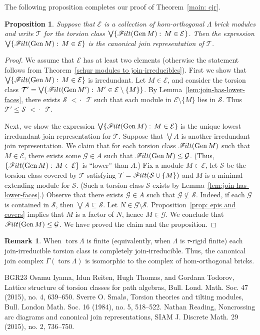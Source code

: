 \documentclass[10pt]{amsart}
\providecommand{\1}{}
\DeclareMathOperator{\tors}{tors}
\newcommand{\calE}{\mathcal{E}}
\newcommand{\calG}{\mathcal{G}}
\newcommand{\calS}{\mathcal{S}}
\newcommand{\calT}{\mathcal{T}}
\newcommand{\filt}{\mathscr{F}\Mk ilt}
\newcommand{\covered}{{\,\,<\!\!\!\!\cdot\,\,\,}}
\renewcommand{\Join}{\bigvee}
\newcommand{\Gen}{\operatorname{Gen}}
\renewcommand{\1}{\hat{1}}
\newcommand{\0}{\hat{0}}
\newcommand*{\Mk}{\mkern -2mu}
\newtheorem{proposition}[theorem]{Proposition}
\theoremstyle{definition}
\newtheorem{remark}[theorem]{Remark}
\begin{document}
The following proposition completes our proof of Theorem~\ref{main: cjr}.
\begin{proposition}\label{cjr end}
Suppose that $\calE$ is a collection of hom-orthogonal $\Lambda$ brick modules and write $\calT$ for the torsion class $\Join \{\filt( \Gen M):\,M\in \calE\}$.
Then the expression $\Join \{\filt( \Gen M):\,M\in \calE\}$ is the canonical join representation of $\calT$.
\end{proposition}
\begin{proof}
We assume that $\calE$ has at least two elements (otherwise the statement follows from Theorem~\ref{schur modules to join-irreducibles}).
First we show that $\Join \{\filt(\Gen M):\,M\in \calE\}$ is irredundant.
Let $M\in \calE$, and consider the torsion class $\calT'= \Join \{\filt(\Gen M'):\,M'\in \calE\setminus \{M\}\}$.
By Lemma~\ref{lem:join-has-lower-faces}, there exists $\calS\covered \calT$ such that each module in $\calE\setminus \{M\}$ lies in $\calS$.
Thus $\calT' \le \calS \covered \calT$.

Next, we show the expression $\Join \{\filt(\Gen M):\,M\in \calE\}$ is the unique lowest irredundant join representation for $\calT$.
Suppose that $\Join A$ is another irredundant join representation.
We claim that for each torsion class $\filt(\Gen M)$ such that $M\in \calE$, there exists some $\calG\in A$ such that $\filt(\Gen M) \le \calG$.
(Thus, $\{\filt(\Gen M):\,M\in \calE\}$ is ``lower'' than $A$.)
Fix a module $M\in \calE$, let $\calS$ be the torsion class covered by $\calT$ satisfying $\calT = \filt(\calS \cup \{M\})$ and $M$ is a minimal extending module for $\calS$.
(Such a torsion class $\calS$ exists by Lemma~\ref{lem:join-has-lower-faces}.)
Observe that there exists $\calG\in A$ such that $\calG\not \subseteq \calS$.
Indeed, if each $\calG$ is contained in $\calS$, then $\Join A \subseteq \calS$.
Let $N\in \calG \setminus \calS$.
Proposition~\ref{prop: epis and covers} implies that $M$ is a factor of $N$, hence $M\in \calG$.
We conclude that $\filt(\Gen M) \le \calG$.
We have proved the claim and the proposition.
\end{proof}
\begin{remark}\label{finite case}
When $\tors \Lambda$ is finite (equivalently, when $\Lambda$ is $\tau$-rigid finite) each join-irreducible torsion class is completely join-irreducible.
Thus, the canonical join complex $\Gamma(\tors \Lambda)$ is isomorphic to the complex of hom-orthogonal bricks.
\end{remark}
\begin{thebibliography}{BGR23}
 Osamu Iyama, Idun Reiten, Hugh Thomas, and Gordana Todorov, Lattice structure of torsion classes for path algebras, Bull. Lond. Math. Soc. 47 (2015), no. 4, 639–650.
 Sverre O. Smalø, Torsion theories and tilting modules, Bull. London Math. Soc. 16 (1984), no. 5, 518–522.
 Nathan Reading, Noncrossing arc diagrams and canonical join representations, SIAM J. Discrete Math. 29 (2015), no. 2, 736–750.
\end{thebibliography}
\end{document}
